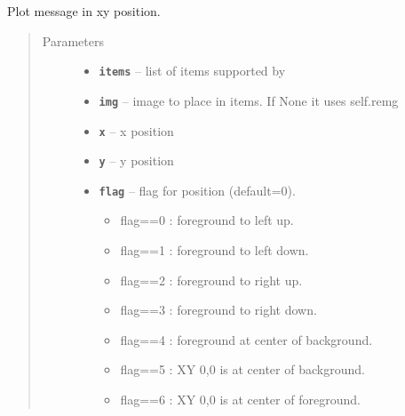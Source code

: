 \documentclass[letterpaper,10pt,english]{sphinxmanual}
\begin{document}
\begin{fulllineitems}
\begin{fulllineitems}
\begin{quote}
\begin{description}
\end{description}\end{quote}

\end{fulllineitems}


\begin{fulllineitems}
\label{RRtoolbox.lib:RRtoolbox.lib.plotter.plotim.plotatxy}
Plot message in xy position.
\begin{quote}\begin{description}
\item[{Parameters}] \leavevmode\begin{itemize}
\item {} 
\textbf{\texttt{items}} -- list of items supported by {\hyperref[RRtoolbox.lib:RRtoolbox.lib.plotter.plotim.makeoverlay]{\emph{}}}

\item {} 
\textbf{\texttt{img}} -- image to place in items. If None it uses self.remg

\item {} 
\textbf{\texttt{x}} -- x position

\item {} 
\textbf{\texttt{y}} -- y position

\item {} 
\textbf{\texttt{flag}} -- 
flag for position (default=0).
\begin{itemize}
\item {} 
flag==0 : foreground to left up.

\item {} 
flag==1 : foreground to left down.

\item {} 
flag==2 : foreground to right up.

\item {} 
flag==3 : foreground to right down.

\item {} 
flag==4 : foreground at center of background.

\item {} 
flag==5 : XY 0,0 is at center of background.

\item {} 
flag==6 : XY 0,0 is at center of foreground.


\end{itemize}
\end{itemize}
\end{description}
\end{quote}
\end{fulllineitems}
\end{fulllineitems}
\end{document}

